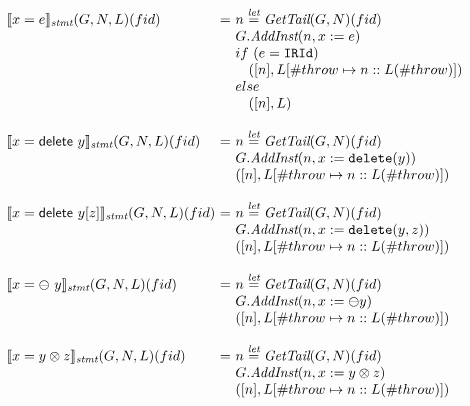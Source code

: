 \[\begin{array}{l@{}l@{~}l}
\transfun{\ircfgexpr{x}{e}}_{\emph{stmt}}(G,N,L)(fid) & = &
	n \letval \GetTail(G,N)(fid)\\
	& & G.\emph{AddInst}(n,x := e)\\
	& & if\ (e = \TT{IRId}) \\
	& & \phantom{if} ([n],L[\#throw \mapsto n::L(\#throw)])\\
	& & else \\
	& & \phantom{if} ([n],L)\\
	& & \\
	
\transfun{\irdelete{x}{y}}_{\emph{stmt}}(G,N,L)(fid) & = &
	n \letval \GetTail(G,N)(fid)\\
	& & G.\emph{AddInst}(n,x := \TT{delete}(y))\\
	& & ([n],L[\#throw \mapsto n::L(\#throw)])\\
	& & \\

\transfun{\irdeleteobj{x}{y}{z}}_{\emph{stmt}}(G,N,L)(fid)\ & = &
	n \letval \GetTail(G,N)(fid)\\
	& & G.\emph{AddInst}(n,x := \TT{delete}(y,z))\\
	& & ([n],L[\#throw \mapsto n::L(\#throw)])\\
	& & \\	
	
\transfun{\irunop{x}{y}}_{\emph{stmt}}(G,N,L)(fid) & = &
	n \letval \GetTail(G,N)(fid)\\
	& & G.\emph{AddInst}(n,x := \preop y)\\
	& & ([n],L[\#throw \mapsto n::L(\#throw)])\\
	& & \\

\transfun{\irbiop{x}{y}{z}}_{\emph{stmt}}(G,N,L)(fid) & = &
	n \letval \GetTail(G,N)(fid)\\
	& & G.\emph{AddInst}(n,x := y \inop z)\\
	& & ([n],L[\#throw \mapsto n::L(\#throw)])\\
	& & \\
	

\end{array}\]
